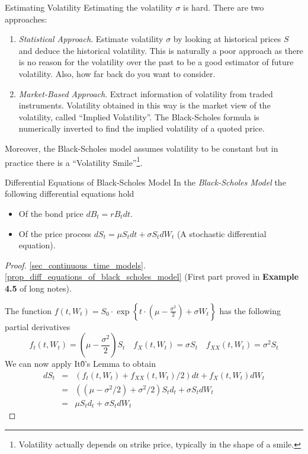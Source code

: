 \documentclass[11pt,a4paper]{article}
\begin{document}
  \begin{remark}{Estimating Volatility}
    Estimating the volatility $\sigma$ is hard. There are two approaches:
    \begin{enumerate}
      \item \textit{Statistical Approach}. Estimate volatility $\sigma$ by looking at historical prices $S$ and deduce the historical volatility. This is naturally a poor approach as there is no reason for the volatility over the past to be a good estimator of future volatility. Also, how far back do you want to consider.
      \item \textit{Market-Based Approach}. Extract information of volatility from traded instruments. Volatility obtained in this way is the market view of the volatility, called ``Implied Volatility''. The Black-Scholes formula is numerically inverted to find the implied volatility of a quoted price.
    \end{enumerate}
    Moreover, the Black-Scholes model assumes volatility to be constant but in practice there is a ``Volatility Smile''\footnote{Volatility actually depends on strike price, typically in the shape of a smile.}.
  \end{remark}

  \begin{proposition}{Differential Equations of Black-Scholes Model}\label{prop_diff_equations_of_black_scholes_model}
    In the \textit{Black-Scholes Model} the following differential equations hold
    \begin{itemize}
      \item Of the bond price $dB_t=rB_tdt$.
      \item Of the price process $dS_t=\mu S_tdt+\sigma S_tdW_t$ (A stochastic differential equation).
    \end{itemize}
  \end{proposition}

  \begin{proof}{\ref{sec_continuous_time_models}.\ref{prop_diff_equations_of_black_scholes_model}}
    (First part proved in \textbf{Example 4.5} of long notes).
    \par The function $f(t,W_t)=S_0\cdot\exp\left\{t\cdot\left(\mu-\frac{\sigma^2}2\right)+\sigma W_t\right\}$ has the following partial derivatives
    \[ f_t(t,W_t)=(\mu-\frac{\sigma^2}2)S_t\quad f_X(t,W_t)=\sigma S_t\quad f_{XX}(t,W_t)=\sigma^2S_t \]
    We can now apply It\^0's Lemma to obtain
    \[\begin{array}{rcl}
      dS_t&=&(f_t(t,W_t)+f_{XX}(t,W_t)/2)dt+f_X(t,W_t)dW_t\\
      &=&\left((\mu-\sigma^2/2)+\sigma^2/2\right)S_td_t+\sigma S_tdW_t\\
      &=&\mu S_td_t+\sigma S_tdW_t
    \end{array}\]
  \end{proof}
\end{document}
